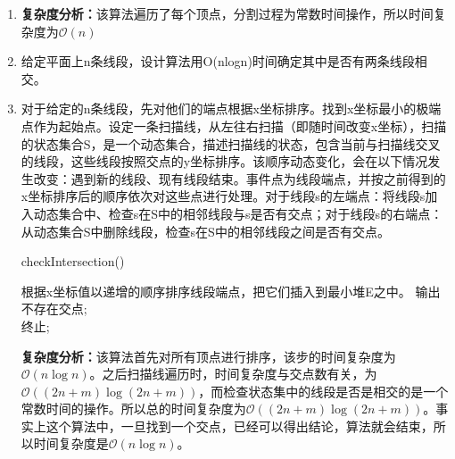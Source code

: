 \documentclass[12pt,a4paper]{article}
\makeatletter
\newtheorem*{solution}{Solution}
\theoremstyle{definition}
\renewenvironment{solution}[1][Solution] {\par\pushQED{\qed}\normalfont\topsep6\p@\@plus6\p@\relax\trivlist\item[\hskip\labelsep\bfseries#1\@addpunct{.}]\ignorespaces}{\popQED\endtrivlist\@endpefalse} \makeatother
\makeatother
\begin{document}
\begin{enumerate}
\begin{solution}
\begin{center}
\begin{algorithm}[H]
		\end{algorithm}
	\end{center}
	\textbf{复杂度分析：}该算法遍历了每个顶点，分割过程为常数时间操作，所以时间复杂度为$\mathcal{O}(n)$
\end{solution}

\item 给定平面上n条线段，设计算法用O(nlogn)时间确定其中是否有两条线段相交。
\begin{solution}
	对于给定的n条线段，先对他们的端点根据x坐标排序。找到x坐标最小的极端点作为起始点。设定一条扫描线，从左往右扫描（即随时间改变x坐标），扫描的状态集合S，是一个动态集合，描述扫描线的状态，包含当前与扫描线交叉的线段，这些线段按照交点的y坐标排序。该顺序动态变化，会在以下情况发生改变：遇到新的线段、现有线段结束。事件点为线段端点，并按之前得到的x坐标排序后的顺序依次对这些点进行处理。对于线段s的左端点：将线段s加入动态集合中、检查s在S中的相邻线段与s是否有交点；对于线段s的右端点：从动态集合S中删除线段，检查s在S中的相邻线段之间是否有交点。
	\begin{center}
		\begin{algorithm}[H]
			\caption{checkIntersection()}
			根据x坐标值以递增的顺序排序线段端点，把它们插入到最小堆E之中。
			输出不存在交点;\\
			终止;
		\end{algorithm}
	\end{center}
	\textbf{复杂度分析：}该算法首先对所有顶点进行排序，该步的时间复杂度为$\mathcal{O}(n\log n)$。之后扫描线遍历时，时间复杂度与交点数有关，为$\mathcal{O}((2n+m)\log(2n+m))$，而检查状态集中的线段是否是相交的是一个常数时间的操作。所以总的时间复杂度为$\mathcal{O}((2n+m)\log(2n+m))$。事实上这个算法中，一旦找到一个交点，已经可以得出结论，算法就会结束，所以时间复杂度是$\mathcal{O}(n\log n)$。
\end{solution}


\end{enumerate}
\end{document}
